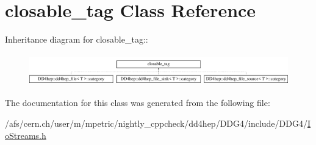 \hypertarget{classboost_1_1iostreams_1_1closable__tag}{
\section{closable\_\-tag Class Reference}
\label{classboost_1_1iostreams_1_1closable__tag}
}
Inheritance diagram for closable\_\-tag::\begin{figure}[H]
\begin{center}
\leavevmode
\includegraphics[height=1.37761cm]{classboost_1_1iostreams_1_1closable__tag}
\end{center}
\end{figure}


The documentation for this class was generated from the following file:\begin{DoxyCompactItemize}
\item 
/afs/cern.ch/user/m/mpetric/nightly\_\-cppcheck/dd4hep/DDG4/include/DDG4/\hyperlink{_io_streams_8h}{IoStreams.h}\end{DoxyCompactItemize}
